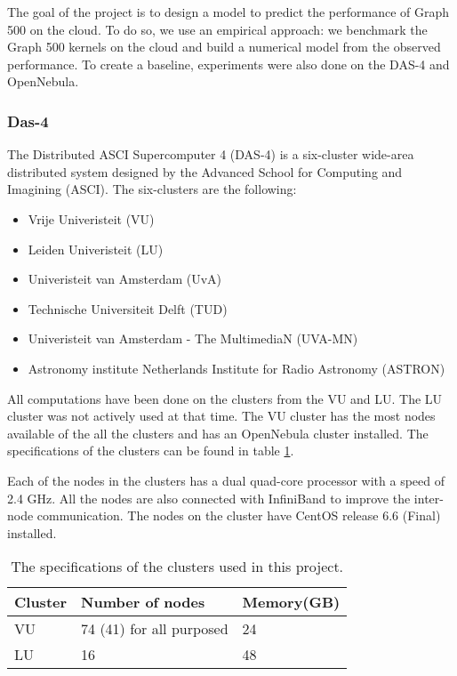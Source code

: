 The goal of the project is to design a model to predict the performance of Graph 500 on the cloud. To do so, we use an empirical approach: we benchmark the Graph 500 kernels on the cloud and build a numerical model from the observed performance. To create a baseline, experiments were also done on the DAS-4 and OpenNebula.
\subsubsection{Das-4}
\label{hw:das4}
The Distributed ASCI Supercomputer 4 (DAS-4) is a six-cluster wide-area distributed system designed by the Advanced School for Computing and Imagining (ASCI)\cite{das-4}. The six-clusters are the following:
\begin{itemize}
\item Vrije Univeristeit (VU)
\item Leiden Univeristeit (LU)
\item Univeristeit van Amsterdam (UvA) 
\item Technische Universiteit Delft (TUD)
\item Univeristeit van Amsterdam - The MultimediaN (UVA-MN) 
\item Astronomy institute Netherlands Institute for Radio Astronomy (ASTRON)
\end{itemize}
All computations have been done on the clusters from the VU and LU. The LU cluster was not actively used at that time. The VU cluster has the most nodes available of the all the clusters and has an OpenNebula cluster installed. The specifications of the clusters can be found in table \ref{tab:das-clusters}. 

Each of the nodes in the clusters has a dual quad-core processor with a speed of 2.4 GHz. All the nodes are also connected with InfiniBand\cite{infiniband} to improve the inter-node communication. The nodes on the cluster have CentOS release 6.6 (Final) installed.
\begin{table}[!h]
	\begin{center}
\begin{tabular}{|l|l|l|}
\hline
Cluster & Number of nodes  & Memory(GB) \\ \hline
VU 		& 74 (41) for all purposed	 & 24			\\ \hline
LU		& 16 & 48 \\ \hline
\end{tabular}
\end{center}
\caption{The specifications of the clusters used in this project.}
\label{tab:das-clusters}
\end{table}

